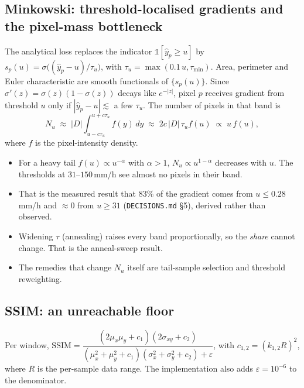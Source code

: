 \documentclass[11pt,a4paper]{article}
\theoremstyle{definition}
\theoremstyle{remark}
\begin{document}
\subsection{Minkowski: threshold-localised gradients and the pixel-mass bottleneck}
The analytical loss replaces the indicator $\mathbb 1[\hat y_p\ge u]$ by
$s_p(u)=\sigma\!\big((\hat y_p-u)/\tau_u\big)$, with $\tau_u=\max(0.1\,u,\tau_{\min})$.
Area, perimeter and Euler characteristic are smooth functionals of $\{s_p(u)\}$. Since
$\sigma'(z)=\sigma(z)(1-\sigma(z))$ decays like $e^{-|z|}$, pixel $p$ receives gradient from
threshold $u$ only if $|\hat y_p-u|\lesssim$ a few $\tau_u$. The number of pixels in that
band is
\begin{equation}
  N_u\;\approx\;|D|\int_{u-c\tau_u}^{u+c\tau_u} f(y)\,dy\;\approx\;2c\,|D|\,\tau_u f(u)\;\propto\; u\,f(u),
\end{equation}
where $f$ is the pixel-intensity density.
\begin{itemize}[nosep]
\item For a heavy tail $f(u)\propto u^{-\alpha}$ with $\alpha>1$, $N_u\propto u^{1-\alpha}$
  decreases with $u$. The thresholds at $31$--$150$\,mm/h see almost no pixels in their band.
\item That is the measured result that 83\% of the gradient comes from $u\le0.28$\,mm/h and
  $\approx0$ from $u\ge31$ (\texttt{DECISIONS.md} \S5), derived rather than observed.
\item Widening $\tau$ (annealing) raises every band proportionally, so the \emph{share}
  cannot change. That is the anneal-sweep result.
\item The remedies that change $N_u$ itself are tail-sample selection and threshold
  reweighting.
\end{itemize}

\subsection{SSIM: an unreachable floor}\label{sec:ssim}
Per window, $\mathrm{SSIM}=\dfrac{(2\mu_x\mu_y+c_1)(2\sigma_{xy}+c_2)}{(\mu_x^2+\mu_y^2+c_1)(\sigma_x^2+\sigma_y^2+c_2)+\varepsilon}$,
with $c_{1,2}=(k_{1,2}R)^2$, where $R$ is the per-sample data range. The implementation also
adds $\varepsilon=10^{-6}$ to the denominator.
\end{document}
